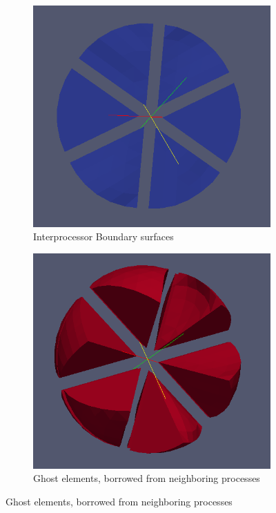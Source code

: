 \begin{figure}[H]
	\begin{subfigure}[b]{0.33\textwidth} \hspace{4mm} \includegraphics[scale=0.22]{images/32-pb}    \captionsetup{width=0.8\textwidth} \caption{ Interprocessor Boundary surfaces} \end{subfigure}
	\begin{subfigure}[b]{0.46\textwidth} \vspace{5mm} \hspace{12mm} \includegraphics[scale=0.25]{images/32-ghost} \captionsetup{width=0.6\textwidth} \caption{ Ghost elements, borrowed from neighboring processes} \end{subfigure}

\end{figure}
